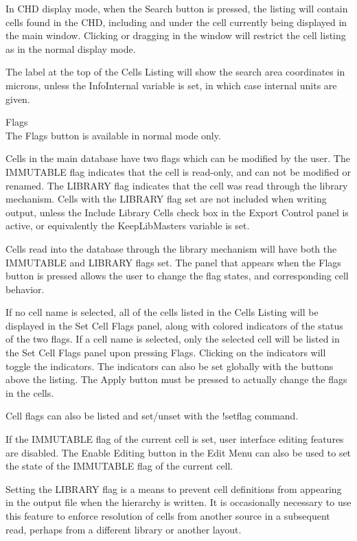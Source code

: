 \begin{description}
In CHD display mode, when the {\cb Search} button is pressed, the
listing will contain cells found in the CHD, including and under the
cell currently being displayed in the main window.  Clicking or
dragging in the window will restrict the cell listing as in the normal
display mode.

The label at the top of the {\cb Cells Listing} will show the search
area coordinates in microns, unless the {\et InfoInternal} variable is
set, in which case internal units are given.

\item{\cb Flags}\\
The {\cb Flags} button is available in normal mode only.

Cells in the main database have two flags which can be modified by the
user.  The IMMUTABLE flag indicates that the cell is read-only, and
can not be modified or renamed.  The LIBRARY flag indicates that the
cell was read through the library mechanism.  Cells with the LIBRARY
flag set are not included when writing output, unless the {\cb Include
Library Cells} check box in the {\cb Export Control} panel is
active, or equivalently the {\et KeepLibMasters} variable is set.

Cells read into the database through the library mechanism will have
both the IMMUTABLE and LIBRARY flags set.  The panel that appears when
the {\cb Flags} button is pressed allows the user to change the flag
states, and corresponding cell behavior.

If no cell name is selected, all of the cells listed in the {\cb Cells
Listing} will be displayed in the {\cb Set Cell Flags} panel, along
with colored indicators of the status of the two flags.  If a cell
name is selected, only the selected cell will be listed in the {\cb
Set Cell Flags} panel upon pressing {\cb Flags}.  Clicking on the
indicators will toggle the indicators.  The indicators can also be set
globally with the buttons above the listing.  The {\cb Apply} button
must be pressed to actually change the flags in the cells.

Cell flags can also be listed and set/unset with the {\cb !setflag}
command.

If the IMMUTABLE flag of the current cell is set, user interface
editing features are disabled.  The {\cb Enable Editing} button in the
{\cb Edit Menu} can also be used to set the state of the IMMUTABLE
flag of the current cell.

Setting the LIBRARY flag is a means to prevent cell definitions from
appearing in the output file when the hierarchy is written.  It is
occasionally necessary to use this feature to enforce resolution of
cells from another source in a subsequent read, perhaps from a
different library or another layout.


\end{description}
